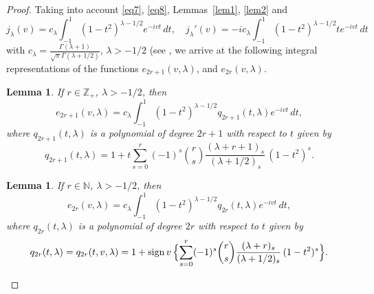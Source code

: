 \documentclass[12pt,twoside,reqno]{amsart}\usepackage[cp1251]{inputenc}
\theoremstyle{plain}
\newtheorem{lemma}[theorem]{Lemma}
\theoremstyle{remark}
\newcommand\sign{\operatorname{sign}}
\begin{document}
\begin{proof}
Taking into account  \eqref{eq7}, \eqref{eq8}, Lemmas~\ref{lem1}, \ref{lem2}  and
\[
j_{\lambda}(v)=c_{\lambda}\int_{-1}^{1}(1-t^2)^{\lambda-1/2}e^{-ivt}\,dt,\quad
j_{\lambda}'(v)=-ic_{\lambda}\int_{-1}^{1}(1-t^2)^{\lambda-1/2}te^{-ivt}\,dt
\]
with
$ c_{\lambda}=\frac{\Gamma(\lambda+1)}{\sqrt{\pi}\Gamma(\lambda+1/2)}$, $\lambda>-1/2$ (see \cite[Chapt.~III, 3.3]{Wa66},
we arrive at the following integral representations of
the functions $e_{2r+1}(v,\lambda)$, and $e_{2r}(v,\lambda)$.

\begin{lemma}\label{lem3}
If $r\in\mathbb{Z}_{+}$, $\lambda>-1/2$, then
\begin{equation}\label{eq11}
e_{2r+1}(v,\lambda)=c_{\lambda}\int_{-1}^{1}(1-t^2)^{\lambda-1/2}q_{2r+1}(t,\lambda)e^{-ivt}\,dt,
\end{equation}
where $q_{2r+1}(t,\lambda)$ is a polynomial of degree  $2r+1$ with respect to $t$ given by
\[
q_{2r+1}(t,\lambda)=1+t\sum_{s=0}^{r}(-1)^{s}
\binom{r}{s}\frac{(\lambda+r+1)_{s}}{(\lambda+1/2)_{s}}\,(1-t^2)^s.
\]
\end{lemma}

\begin{lemma}\label{lem4}
If $r\in\mathbb{N}$, $\lambda>-1/2$, then
\begin{equation}\label{eq11----}
e_{2r}(v,\lambda)=c_{\lambda}\int_{-1}^{1}(1-t^2)^{\lambda-1/2}q_{2r}(t,\lambda)e^{-ivt}\,dt,
\end{equation}
where $q_{2r}(t,\lambda)$ is a polynomial of degree  $2r$ with respect to $t$ given by
\[
q_{2r}(t,\lambda)=q_{2r}(t,v,\lambda)
=1+\sign{}v\,\Bigl\{\sum_{s=0}^{r}(-1)^{s}
\binom{r}{s}\frac{(\lambda+r)_{s}}{(\lambda+1/2)_{s}}\,(1-t^2)^s\Bigr\}.
\]
\end{lemma}


\end{proof}
\end{document}
